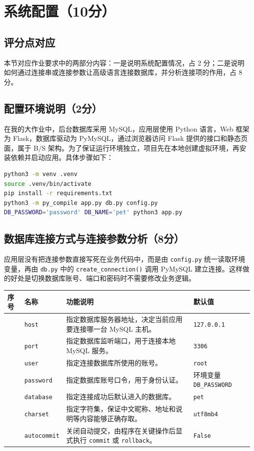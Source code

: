 \documentclass[12pt,a4paper,fontset=none]{ctexart}
\begin{document}
\section{系统配置（10分）}

\subsection{评分点对应}
本节对应作业要求中的两部分内容：一是说明系统配置情况，占 2 分；二是说明如何通过连接串或连接参数让高级语言连接数据库，并分析连接项的作用，占 8 分。

\subsection{配置环境说明（2分）}
 在我的大作业中，后台数据库采用 MySQL，应用层使用 Python 语言，Web 框架为 Flask，数据库驱动为 PyMySQL，通过浏览器访问 Flask 提供的接口和静态页面，属于 B/S 架构。为了保证运行环境独立，项目先在本地创建虚拟环境，再安装依赖并启动应用。具体步骤如下：

\begin{lstlisting}[language=bash, caption={Python 后端环境配置与启动命令}]
python3 -m venv .venv
source .venv/bin/activate
pip install -r requirements.txt
python3 -m py_compile app.py db.py config.py
DB_PASSWORD='password' DB_NAME='pet' python3 app.py
\end{lstlisting}
 

\subsection{数据库连接方式与连接参数分析（8分）}
应用层没有把连接参数直接写死在业务代码中，而是由 \texttt{config.py} 统一读取环境变量，再由 \texttt{db.py} 中的 \texttt{create\_connection()} 调用 PyMySQL 建立连接。这样做的好处是切换数据库账号、端口和密码时不需要修改业务逻辑。

{\scriptsize
\begin{tabularx}{\linewidth}{|>{\centering\arraybackslash}p{0.9cm}|>{\centering\arraybackslash}p{1.7cm}|Y|>{\centering\arraybackslash}p{2.5cm}|}
\hline
序号 & 名称 & 功能说明 & 默认值\\
 & \texttt{host} & 指定数据库服务器地址，决定当前应用要连接哪一台 MySQL 主机。 & \texttt{127.0.0.1} \\
 & \texttt{port} & 指定数据库监听端口，用于连接本地 MySQL 服务。 & \texttt{3306} \\
 & \texttt{user} & 指定连接数据库所使用的账号。 & \texttt{root} \\
 & \texttt{password} & 指定数据库账号口令，用于身份认证。 & 环境变量 \texttt{DB\_PASSWORD} \\
 & \texttt{database} & 指定连接成功后默认进入的数据库。 & \texttt{pet} \\
 & \texttt{charset} & 指定字符集，保证中文昵称、地址和说明等内容能够正确存取。 & \texttt{utf8mb4} \\
 & \texttt{autocommit} & 关闭自动提交，由程序在关键操作后显式执行 \texttt{commit} 或 \texttt{rollback}。 & \texttt{False} \\
\hline
\end{tabularx}
}
\end{document}

